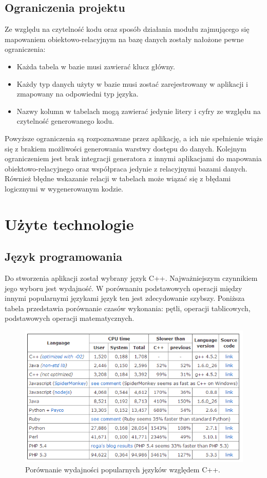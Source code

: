 \documentclass[12pt]{report}
\begin{document}
\subsection{Ograniczenia projektu}
	\indent Ze względu na czytelność kodu oraz sposób działania modułu zajmującego się mapowaniem obiektowo-relacyjnym na bazę danych zostały nałożone pewne ograniczenia:
	\begin{itemize}
	\item{Każda tabela w bazie musi zawierać klucz główny.}
	\item{Każdy typ danych użyty w bazie musi zostać zarejestrowany w aplikacji i zmapowany na odpowiedni typ języka.}
	\item{Nazwy kolumn w tabelach mogą zawierać jedynie litery i cyfry ze względu na czytelność generowanego kodu.}
	\end{itemize}
	\indent Powyższe ograniczenia są rozpoznawane przez aplikację, a ich nie spełnienie wiąże się z brakiem możliwości generowania warstwy dostępu do danych. Kolejnym ograniczeniem jest brak integracji generatora z innymi aplikacjami do mapowania obiektowo-relacyjnego oraz współpraca jedynie z relacyjnymi bazami danych. Również błędne wskazanie relacji w tabelach może wiązać się z błędami logicznymi w wygenerowanym kodzie.
\section{Użyte technologie}
\subsection{Język programowania}
Do stworzenia aplikacji został wybrany język C++. Najważniejszym czynnikiem jego wyboru jest wydajność. W porównaniu podstawowych operacji między innymi popularnymi językami język ten jest zdecydowanie szybszy. Poniższa tabela przedstawia porównanie czasów wykonania: pętli, operacji tablicowych, podstawowych operacji matematycznych.
\begin{figure}[h]
	\centering
	\includegraphics[width=1\textwidth]{images/c++test.png}
	\caption{Porównanie wydajności popularnych języków względem C++. \cite{c++testimg}}
\end{figure}
\FloatBarrier
\end{document}
